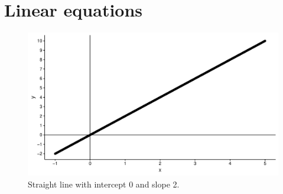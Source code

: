 \documentclass[]{book}\usepackage[]{graphicx}\usepackage[]{color}
\makeatletter
\def\maxwidth{ %
  \ifdim\Gin@nat@width>\linewidth
    \linewidth
  \else
    \Gin@nat@width
  \fi
}
\newenvironment{knitrout}{}{} %
\makeatother
\begin{document}
% 
% 



\section{Linear equations}


\begin{knitrout}
\color{fgcolor}\begin{figure}

{\centering \includegraphics[width=\maxwidth]{figure/lm_1-1} 

}

\caption[Straight line with intercept 0 and slope 2]{Straight line with intercept 0 and slope 2.}\label{fig:lm_1}
\end{figure}


\end{knitrout}
\end{document}

